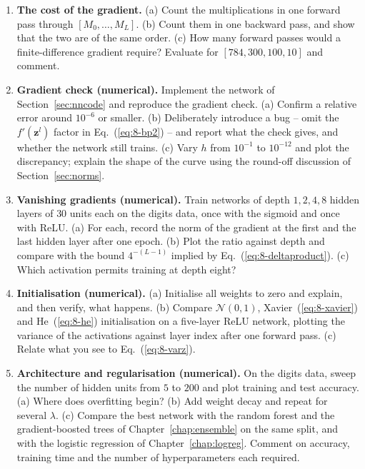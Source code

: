 \begin{enumerate}
\item \textbf{The cost of the gradient.}
  (a) Count the multiplications in one forward pass through
      $[M_0,\dots,M_L]$.
  (b) Count them in one backward pass, and show that the two are of the same
      order.
  (c) How many forward passes would a finite-difference gradient require?
      Evaluate for $[784,300,100,10]$ and comment.

\item \textbf{Gradient check (numerical).}
  Implement the network of Section~\ref{sec:nncode} and reproduce the gradient
  check.
  (a) Confirm a relative error around $10^{-6}$ or smaller.
  (b) Deliberately introduce a bug -- omit the $f'(\bm{z}^{l})$ factor in
      Eq.~(\ref{eq:8-bp2}) -- and report what the check gives, and whether the
      network still trains.
  (c) Vary $h$ from $10^{-1}$ to $10^{-12}$ and plot the discrepancy; explain
      the shape of the curve using the round-off discussion of
      Section~\ref{sec:norms}.

\item \textbf{Vanishing gradients (numerical).}
  Train networks of depth $1,2,4,8$ hidden layers of $30$ units each on the
  digits data, once with the sigmoid and once with ReLU.
  (a) For each, record the norm of the gradient at the first and the last
      hidden layer after one epoch.
  (b) Plot the ratio against depth and compare with the bound
      $4^{-(L-1)}$ implied by Eq.~(\ref{eq:8-deltaproduct}).
  (c) Which activation permits training at depth eight?

\item \textbf{Initialisation (numerical).}
  (a) Initialise all weights to zero and explain, and then verify, what
      happens.
  (b) Compare $\mathcal{N}(0,1)$, Xavier~(\ref{eq:8-xavier}) and
      He~(\ref{eq:8-he}) initialisation on a five-layer ReLU network, plotting
      the variance of the activations against layer index after one forward
      pass.
  (c) Relate what you see to Eq.~(\ref{eq:8-varz}).

\item \textbf{Architecture and regularisation (numerical).}
  On the digits data, sweep the number of hidden units from $5$ to $200$ and
  plot training and test accuracy.
  (a) Where does overfitting begin?
  (b) Add weight decay and repeat for several $\lambda$.
  (c) Compare the best network with the random forest and the gradient-boosted
      trees of Chapter~\ref{chap:ensemble} on the same split, and with the
      logistic regression of Chapter~\ref{chap:logreg}.  Comment on accuracy,
      training time and the number of hyperparameters each required.

\end{enumerate}

